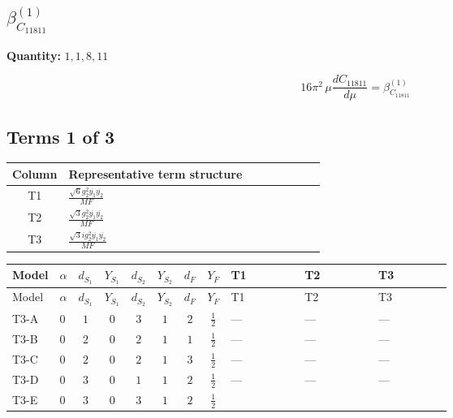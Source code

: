\documentclass[8pt]{article}
\begin{document}
\begin{landscape}
\section*{$\beta_{C_{11811}}^{(1)}$}
\noindent\textbf{Quantity: }$\mathrm{1,1,8,11}$\par\smallskip
\[16\pi^2\,\mu\frac{d C_{11811}}{d\mu}=\beta_{C_{11811}}^{(1)}\]
\subsection*{Terms 1 of 3}
\begin{center}
\begin{tabular}{@{}c >{\raggedright\arraybackslash}p{0.82\linewidth}@{}}
\toprule
Column & Representative term structure \\
\midrule
T1 & \(\displaystyle \frac{\sqrt{6} g_{2}^{2} \overline{y_{1}} \overline{y_{2}}}{MF}\) \\
\midrule
T2 & \(\displaystyle \frac{\sqrt{3} g_{2}^{2} \overline{y_{1}} \overline{y_{2}}}{MF}\) \\
\midrule
T3 & \(\displaystyle \frac{\sqrt{3} i g_{2}^{2} \overline{y_{1}} \overline{y_{2}}}{MF}\) \\
\midrule
\bottomrule
\end{tabular}
\end{center}
\smallskip
\tiny
\begin{longtable}{@{}llcccccc >{\raggedright\arraybackslash}p{0.21\linewidth} >{\raggedright\arraybackslash}p{0.21\linewidth} >{\raggedright\arraybackslash}p{0.21\linewidth}@{}}
\toprule
Model & $\alpha$ & $d_{S_1}$ & $Y_{S_1}$ & $d_{S_2}$ & $Y_{S_2}$ & $d_F$ & $Y_F$ & T1 & T2 & T3 \\
\midrule
\endfirsthead
\toprule
Model & $\alpha$ & $d_{S_1}$ & $Y_{S_1}$ & $d_{S_2}$ & $Y_{S_2}$ & $d_F$ & $Y_F$ & T1 & T2 & T3 \\
\midrule
\endhead
T3-A & $0$ & $1$ & $0$ & $3$ & $1$ & $2$ & $\frac{1}{2}$ & --- & --- & --- \\
\midrule
T3-B & $0$ & $2$ & $0$ & $2$ & $1$ & $1$ & $\frac{1}{2}$ & --- & --- & --- \\
\midrule
T3-C & $0$ & $2$ & $0$ & $2$ & $1$ & $3$ & $\frac{1}{2}$ & --- & --- & --- \\
\midrule
T3-D & $0$ & $3$ & $0$ & $1$ & $1$ & $2$ & $\frac{1}{2}$ & --- & --- & --- \\
\midrule
T3-E & $0$ & $3$ & $0$ & $3$ & $1$ & $2$ & $\frac{1}{2}$ & \scriptsize\adjustbox{max width=\linewidth}{$\begin{gathered} \frac{\sqrt{6} g_{2}^{2} \overline{y_{1}} \overline{y_{2}}}{3 MF}\end{gathered}$} & \scriptsize\adjustbox{max width=\linewidth}{$\begin{gathered} \frac{\sqrt{3} g_{2}^{2} \overline{y_{1}} \overline{y_{2}}}{6 MF}\end{gathered}$} & \scriptsize\adjustbox{max width=\linewidth}{$\begin{gathered} - \frac{49 \sqrt{3} i g_{2}^{2} \overline{y_{1}} \overline{y_{2}}}{24 MF}\end{gathered}$} \\

\end{longtable}
\end{landscape}
\end{document}
